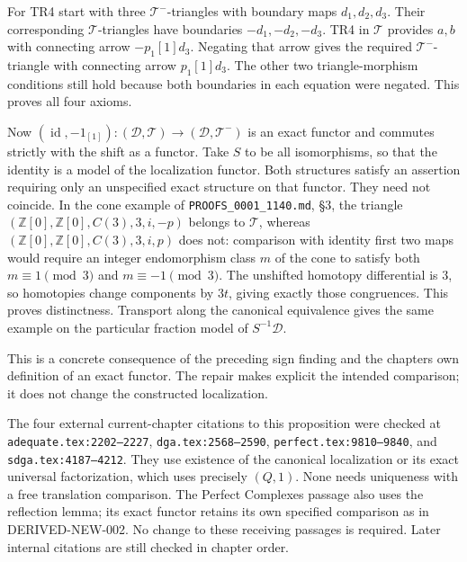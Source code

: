 \documentclass[11pt]{article}
\begin{document}
For TR4 start with three \(\mathcal T^-\)-triangles with boundary maps \(d_1,d_2,d_3\). Their corresponding \(\mathcal T\)-triangles have boundaries \(-d_1,-d_2,-d_3\). TR4 in \(\mathcal T\) provides \(a,b\) with connecting arrow \(-p_1[1]d_3\). Negating that arrow gives the required \(\mathcal T^-\)-triangle with connecting arrow \(p_1[1]d_3\). The other two triangle-morphism conditions still hold because both boundaries in each equation were negated. This proves all four axioms.

Now \((\operatorname{id},-1_{[1]}):
(\mathcal D,\mathcal T)\to(\mathcal D,\mathcal T^-)\) is an exact functor and commutes strictly with the shift as a functor. Take \(S\) to be all isomorphisms,\allowbreak{} so that the identity is a model of the localization functor. Both structures satisfy an assertion requiring only an unspecified exact structure on that functor. They need not coincide. In the cone example of \texttt{PROOFS\_\allowbreak{}0001\_\allowbreak{}1140.\allowbreak{}md},\allowbreak{} §3,\allowbreak{} the triangle \((\mathbb Z[0],\mathbb Z[0],C(3),3,i,-p)\) belongs to \(\mathcal T\),\allowbreak{} whereas \((\mathbb Z[0],\mathbb Z[0],C(3),3,i,p)\) does not:\allowbreak{} comparison with identity first two maps would require an integer endomorphism class \(m\) of the cone to satisfy both \(m\equiv1\pmod3\) and \(m\equiv-1\pmod3\). The unshifted homotopy differential is \(3\),\allowbreak{} so homotopies change components by \(3t\),\allowbreak{} giving exactly those congruences. This proves distinctness. Transport along the canonical equivalence gives the same example on the particular fraction model of \(S^{-1}\mathcal D\).

This is a concrete consequence of the preceding sign finding and the chapter\textquotesingle s own definition of an exact functor. The repair makes explicit the intended comparison; it does not change the constructed localization.

The four external current-chapter citations to this proposition were checked at \texttt{adequate.\allowbreak{}tex:\allowbreak{}2202–\allowbreak{}2227},\allowbreak{} \texttt{dga.\allowbreak{}tex:\allowbreak{}2568–\allowbreak{}2590},\allowbreak{} \texttt{perfect.\allowbreak{}tex:\allowbreak{}9810–\allowbreak{}9840},\allowbreak{} and \texttt{sdga.\allowbreak{}tex:\allowbreak{}4187–\allowbreak{}4212}. They use existence of the canonical localization or its exact universal factorization,\allowbreak{} which uses precisely \((Q,1)\). None needs uniqueness with a free translation comparison. The Perfect Complexes passage also uses the reflection lemma; its exact functor retains its own specified comparison as in DERIVED-NEW-002. No change to these receiving passages is required. Later internal citations are still checked in chapter order.
\end{document}
